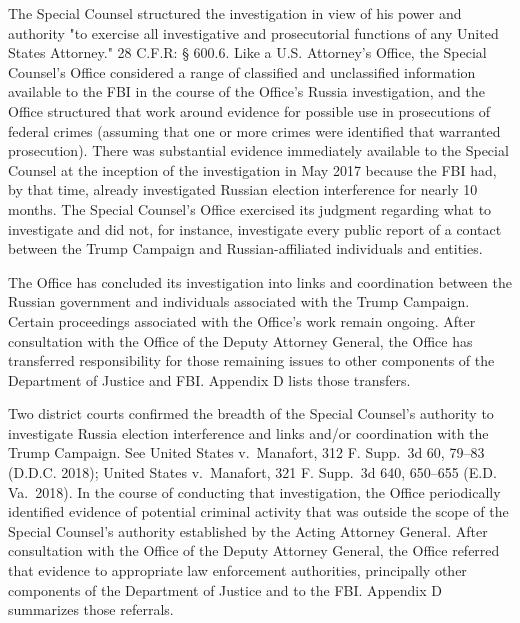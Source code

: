 The Special Counsel structured the investigation in view of his power and authority "to exercise all investigative and prosecutorial functions of any United States Attorney." 28 C.F.R: § 600.6. Like a U.S. Attorney's Office, the Special Counsel's Office considered a range of classified and unclassified information available to the FBI in the course of the Office's Russia investigation, and the Office structured that work around evidence for possible use in prosecutions of federal crimes (assuming that one or more crimes were identified that warranted prosecution).
There was substantial evidence immediately available to the Special Counsel at the inception of the investigation in May 2017 because the FBI had, by that time, already investigated Russian election interference for nearly 10 months.
The Special Counsel's Office exercised its judgment regarding what to investigate and did not, for instance, investigate every public report of a contact between the Trump Campaign and Russian-affiliated individuals and entities.

The Office has concluded its investigation into links and coordination between the Russian government and individuals associated with the Trump Campaign.
Certain proceedings associated with the Office's work remain ongoing.
After consultation with the Office of the Deputy Attorney General, the Office has transferred responsibility for those remaining issues to other components of the Department of Justice and FBI.
Appendix D lists those transfers.

Two district courts confirmed the breadth of the Special Counsel's authority to investigate Russia election interference and links and/or coordination with the Trump Campaign.
See United States v.\ Manafort, 312 F. Supp.~3d 60, 79--83 (D.D.C. 2018); United States v.\ Manafort, 321 F. Supp.~3d 640, 650--655 (E.D. Va.~2018).
In the course of conducting that investigation, the Office periodically identified evidence of potential criminal activity that was outside the scope of the Special Counsel's authority established by the Acting Attorney General.
After consultation with the Office of the Deputy Attorney General, the Office referred that evidence to appropriate law enforcement authorities, principally other components of the Department of Justice and to the FBI.
Appendix D summarizes those referrals.

\hr

